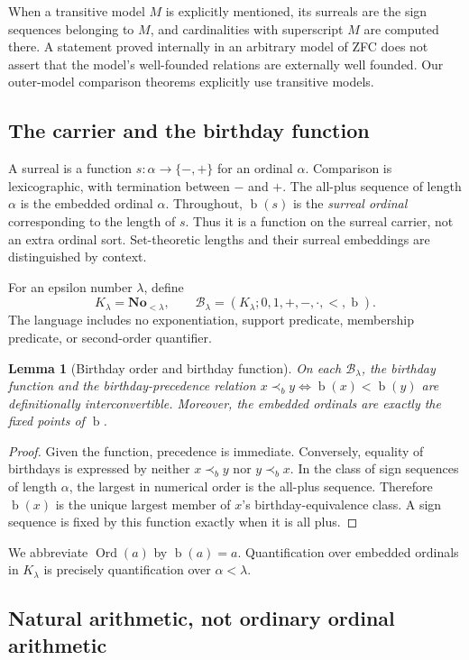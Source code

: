 \documentclass[11pt,letterpaper]{article}
\newtheorem{lemma}[theorem]{Lemma}
\theoremstyle{definition}
\theoremstyle{remark}
\newcommand{\No}{\mathbf{No}}
\newcommand{\Ord}{\operatorname{Ord}}
\newcommand{\bd}{\operatorname{b}}
\newcommand{\B}{\mathcal B}
\begin{document}
When a transitive model $M$ is explicitly mentioned, its surreals are the sign
sequences belonging to $M$, and cardinalities with superscript $M$ are computed
there. A statement proved internally in an arbitrary model of ZFC does not
assert that the model's well-founded relations are externally well founded.
Our outer-model comparison theorems explicitly use transitive models.

\subsection{The carrier and the birthday function}

A surreal is a function $s:\alpha\longrightarrow\{-,+\}$ for an ordinal
$\alpha$. Comparison is lexicographic, with termination between $-$ and $+$.
The all-plus sequence of length $\alpha$ is the embedded ordinal $\alpha$.
Throughout, $\bd(s)$ is the \emph{surreal ordinal} corresponding to the length
of $s$. Thus it is a function on the surreal carrier, not an extra ordinal
sort. Set-theoretic lengths and their surreal embeddings are distinguished
by context.

For an epsilon number $\lambda$, define
\[
 K_\lambda=\No_{<\lambda},\qquad
 \B_\lambda=(K_\lambda;0,1,+,-,\cdot,<,\bd).
\]
The language includes no exponentiation, support predicate, membership
predicate, or second-order quantifier.

\begin{lemma}[Birthday order and birthday function]
\label{lem:birthday-language}
On each $\B_\lambda$, the birthday function and the birthday-precedence
relation $x\prec_b y\iff\bd(x)<\bd(y)$ are definitionally interconvertible.
Moreover, the embedded ordinals are exactly the fixed points of $\bd$.
\end{lemma}
\begin{proof}
Given the function, precedence is immediate. Conversely, equality of birthdays
is expressed by neither $x\prec_b y$ nor $y\prec_b x$. In the class of sign
sequences of length $\alpha$, the largest in numerical order is the all-plus
sequence. Therefore $\bd(x)$ is the unique largest member of $x$'s
birthday-equivalence class. A sign sequence is fixed by this function exactly
when it is all plus.
\end{proof}

We abbreviate $\Ord(a)$ by $\bd(a)=a$. Quantification over embedded ordinals
in $K_\lambda$ is precisely quantification over $\alpha<\lambda$.

\subsection{Natural arithmetic, not ordinary ordinal arithmetic}
\end{document}
